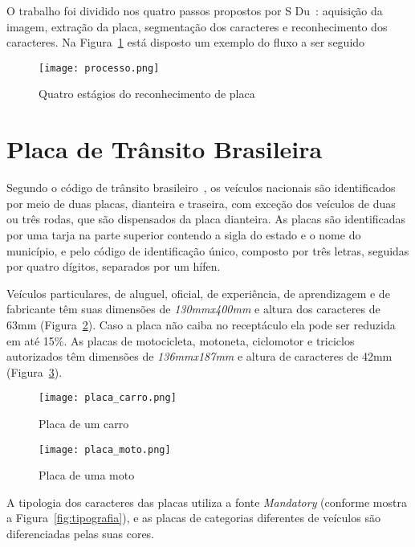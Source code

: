 O trabalho foi dividido nos quatro passos propostos por S
Du~\cite{s2013automatic}: aquisição da imagem, extração da placa, segmentação
dos caracteres e reconhecimento dos caracteres. Na Figura~\ref{fig:processo}
está disposto um exemplo do fluxo a ser seguido

\begin{figure}[H]
	\centering
	\texttt{[image: processo.png]}
	\caption{Quatro estágios do reconhecimento de placa}
	\label{fig:processo}
\end{figure}

\section{Placa de Trânsito Brasileira}
\label{sec:placabr}

Segundo o código de trânsito brasileiro~\cite{brasil1997lei}, os veículos
nacionais são identificados por meio de duas placas, dianteira e traseira, com
exceção dos veículos de duas ou três rodas, que são dispensados da placa
dianteira. As placas são identificadas por uma tarja na parte superior contendo
a sigla do estado e o nome do município, e pelo código de identificação único,
composto por três letras, seguidas por quatro dígitos, separados por um hífen.

Veículos particulares, de aluguel, oficial, de experiência, de aprendizagem e de
fabricante têm suas dimensões de \emph{130mmx400mm} e altura dos caracteres de
63mm (Figura~\ref{fig:placa_carro}).  Caso a placa não caiba no receptáculo ela
pode ser reduzida em até 15\%. As placas de motocicleta, motoneta, ciclomotor e
triciclos autorizados têm dimensões de \emph{136mmx187mm} e altura de caracteres
de 42mm (Figura~\ref{fig:placa_moto}).

\begin{figure}[H]
	\centering
	\texttt{[image: placa\_carro.png]}
	\caption{Placa de um carro}
	\label{fig:placa_carro}
\end{figure}

\begin{figure}[H]
	\centering
	\texttt{[image: placa\_moto.png]}
	\caption{Placa de uma moto}
	\label{fig:placa_moto}
\end{figure}

A tipologia dos caracteres das placas utiliza a fonte \emph{Mandatory} (conforme
mostra a Figura~\ref{fig:tipografia}), e as placas de categorias diferentes de
veículos são diferenciadas pelas suas cores.

